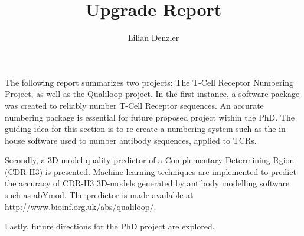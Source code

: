 
\title{Upgrade Report}
\author{Lilian Denzler}

\maketitle


\begin{Overview} %

The following report summarizes two projects: The T-Cell Receptor Numbering Project, as well as the Qualiloop project. 
In the first instance, a software package was created to reliably number T-Cell Receptor sequences. An accurate numbering package is essential for future proposed project within the PhD. The guiding idea for this section is to re-create a numbering system such as the in-house software used to number antibody sequences, applied to TCRs. 

Secondly, a 3D-model quality predictor of a Complementary Determining Rgion (CDR-H3) is presented. Machine learning techniques are implemented to predict the accuracy of CDR-H3 3D-models generated by antibody modelling software such as abYmod. The predictor is made available at \url{http://www.bioinf.org.uk/abs/qualiloop/}. 

Lastly, future directions for the PhD project are explored. 

\end{Overview}



\setcounter{tocdepth}{2} 

\tableofcontents

